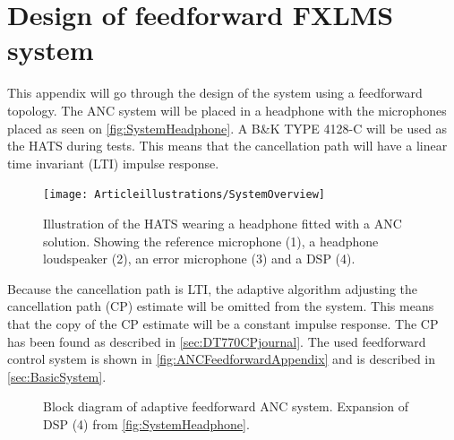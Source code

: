 \section{Design of feedforward FXLMS system} \label{sec:systemDesign}
This appendix will go through the design of the system using a feedforward topology. The ANC system will be placed in a headphone with the microphones placed as seen on \autoref{fig:SystemHeadphone}. A B\&K TYPE 4128-C will be used as the HATS during tests. This means that the cancellation path will have a linear time invariant (LTI) impulse response. 



\begin{figure}[H]
	\centering
	\texttt{[image: Articleillustrations/SystemOverview]}
	\caption{Illustration of the HATS wearing a headphone fitted with a ANC solution. Showing the reference microphone (1), a headphone loudspeaker (2), an error microphone (3) and a DSP (4).}
	\label{fig:SystemHeadphone}
\end{figure}  

Because the cancellation path is LTI, the adaptive algorithm adjusting the cancellation path (CP) estimate will be omitted from the system. This means that the copy of the CP estimate will be a constant impulse response. The CP has been found as described in \autoref{sec:DT770CPjournal}. The used feedforward control system is shown in \autoref{fig:ANCFeedforwardAppendix} and is described in \autoref{sec:BasicSystem}.


\begin{figure}[H]
	\centering
	
	\caption{Block diagram of adaptive feedforward ANC system. Expansion of DSP (4) from \autoref{fig:SystemHeadphone}.}
	\label{fig:ANCFeedforwardAppendix}
\end{figure}



